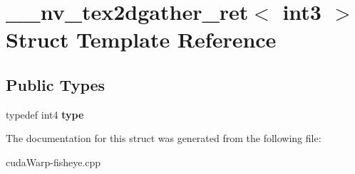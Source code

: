 \hypertarget{struct____nv__tex2dgather__ret_3_01int3_01_4}{}\section{\+\_\+\+\_\+nv\+\_\+tex2dgather\+\_\+ret$<$ int3 $>$ Struct Template Reference}
\label{struct____nv__tex2dgather__ret_3_01int3_01_4}
\subsection*{Public Types}
\begin{DoxyCompactItemize}
\item 
typedef int4 {\bfseries type}\hypertarget{struct____nv__tex2dgather__ret_3_01int3_01_4_a758eb8e7b3e2d8fc5a228260ed18d495}{}\label{struct____nv__tex2dgather__ret_3_01int3_01_4_a758eb8e7b3e2d8fc5a228260ed18d495}

\end{DoxyCompactItemize}


The documentation for this struct was generated from the following file\+:\begin{DoxyCompactItemize}
\item 
cuda\+Warp-\/fisheye.\+cpp\end{DoxyCompactItemize}
